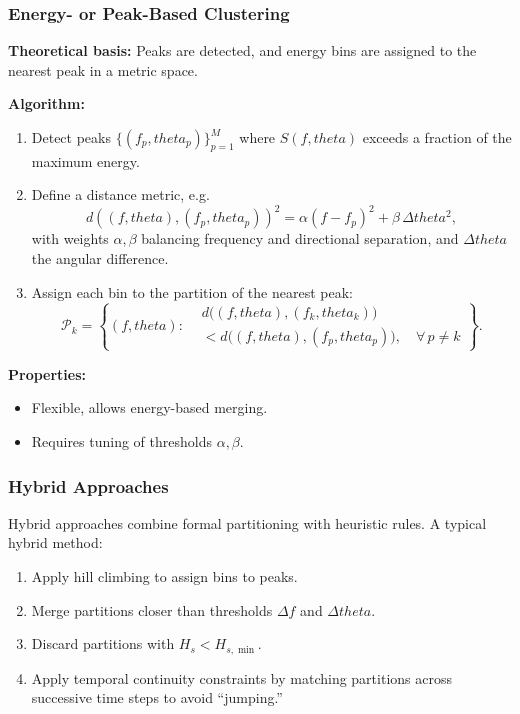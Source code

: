 \documentclass[journal,10pt,twocolumn]{IEEEtran}
\def\theta{theta}%
\begin{document}
    \subsubsection{Energy- or Peak-Based Clustering}
    \textbf{Theoretical basis:} Peaks are detected, and energy bins are assigned to the nearest peak in a metric space.

    \textbf{Algorithm:}
    \begin{enumerate}[leftmargin=1.5em]
        \item Detect peaks $\{(f_p,\theta_p)\}_{p=1}^M$ where $S(f,\theta)$ exceeds a fraction of the maximum energy.
        \item Define a distance metric, e.g.
        \[
            d((f,\theta),(f_p,\theta_p))^2 = \alpha (f-f_p)^2 + \beta \, \Delta\theta^2,
        \]
        with weights $\alpha,\beta$ balancing frequency and directional separation, and $\Delta\theta$ the angular difference.
        \item Assign each bin to the partition of the nearest peak:
		\[
		\mathcal{P}_k
		=
		\left\{
		(f,\theta) :
		\begin{aligned}
		& d\big((f,\theta),(f_k,\theta_k)\big) \\
		&< d\big((f,\theta),(f_p,\theta_p)\big),
		\quad \forall\, p \ne k
		\end{aligned}
		\right\}.
		\]
    \end{enumerate}

    \textbf{Properties:}
    \begin{itemize}[leftmargin=1.4em]
        \item Flexible, allows energy-based merging.
        \item Requires tuning of thresholds $\alpha,\beta$.
    \end{itemize}

    \subsubsection{Hybrid Approaches}
    Hybrid approaches combine formal partitioning with heuristic rules. A typical hybrid method:
    \begin{enumerate}[leftmargin=1.5em]
        \item Apply hill climbing to assign bins to peaks.
        \item Merge partitions closer than thresholds $\Delta f$ and $\Delta\theta$.
        \item Discard partitions with $H_s < H_{s,\min}$.
        \item Apply temporal continuity constraints by matching partitions across successive time steps to avoid ``jumping.''
    \end{enumerate}
\end{document}
